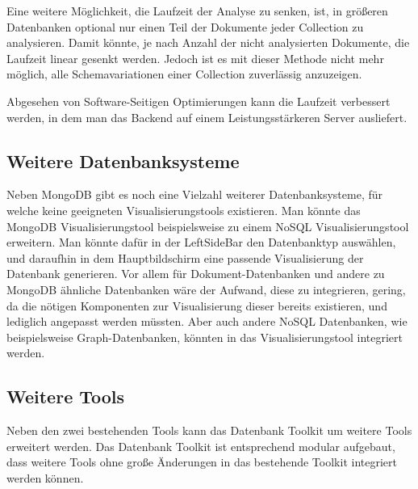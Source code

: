 Eine weitere Möglichkeit, die Laufzeit der Analyse zu senken, ist, in größeren Datenbanken optional nur einen Teil der Dokumente jeder Collection zu analysieren.
Damit könnte, je nach Anzahl der nicht analysierten Dokumente, die Laufzeit linear gesenkt werden.
Jedoch ist es mit dieser Methode nicht mehr möglich, alle Schemavariationen einer Collection zuverlässig anzuzeigen.

Abgesehen von Software-Seitigen Optimierungen kann die Laufzeit verbessert werden, in dem man das Backend auf einem Leistungsstärkeren Server ausliefert.

\subsection{Weitere Datenbanksysteme}
\label{sub:ausblick_weitere_dbs}

Neben MongoDB gibt es noch eine Vielzahl weiterer Datenbanksysteme, für welche keine geeigneten Visualisierungstools existieren.
Man könnte das MongoDB Visualisierungstool beispielsweise zu einem NoSQL Visualisierungstool erweitern.
Man könnte dafür in der LeftSideBar den Datenbanktyp auswählen, und daraufhin in dem Hauptbildschirm eine passende Visualisierung der Datenbank generieren.
Vor allem für Dokument-Datenbanken und andere zu MongoDB ähnliche Datenbanken wäre der Aufwand, diese zu integrieren, gering, da die nötigen Komponenten zur Visualisierung dieser bereits existieren, und lediglich angepasst werden müssten.
Aber auch andere NoSQL Datenbanken, wie beispielsweise Graph-Datenbanken, könnten in das Visualisierungstool integriert werden.

\subsection{Weitere Tools}
\label{sub:ausblick_tools}

Neben den zwei bestehenden Tools kann das Datenbank Toolkit um weitere Tools erweitert werden.
Das Datenbank Toolkit ist entsprechend modular aufgebaut, dass weitere Tools ohne große Änderungen in das bestehende Toolkit integriert werden können.
